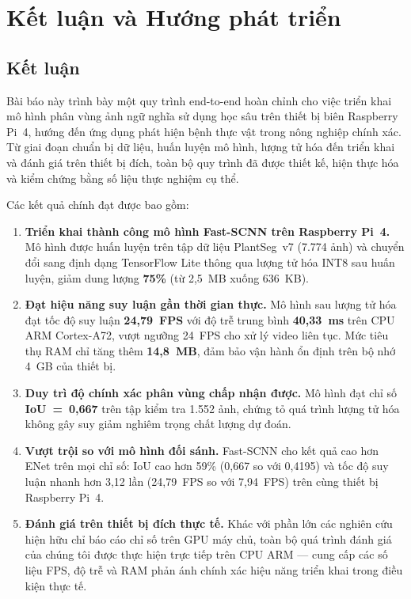 \documentclass[conference]{IEEEtran}
\begin{document}
\section{Kết luận và Hướng phát triển}

\subsection{Kết luận}

Bài báo này trình bày một quy trình end-to-end hoàn chỉnh cho việc triển khai mô hình phân vùng ảnh ngữ nghĩa sử dụng học sâu trên thiết bị biên Raspberry Pi~4, hướng đến ứng dụng phát hiện bệnh thực vật trong nông nghiệp chính xác. Từ giai đoạn chuẩn bị dữ liệu, huấn luyện mô hình, lượng tử hóa đến triển khai và đánh giá trên thiết bị đích, toàn bộ quy trình đã được thiết kế, hiện thực hóa và kiểm chứng bằng số liệu thực nghiệm cụ thể.

Các kết quả chính đạt được bao gồm:
\begin{enumerate}
  \item \textbf{Triển khai thành công mô hình Fast-SCNN trên Raspberry Pi~4.} Mô hình được huấn luyện trên tập dữ liệu PlantSeg~v7 (7.774 ảnh) và chuyển đổi sang định dạng TensorFlow Lite thông qua lượng tử hóa INT8 sau huấn luyện, giảm dung lượng \textbf{75\%} (từ 2,5~MB xuống 636~KB).
  \item \textbf{Đạt hiệu năng suy luận gần thời gian thực.} Mô hình sau lượng tử hóa đạt tốc độ suy luận \textbf{24,79~FPS} với độ trễ trung bình \textbf{40,33~ms} trên CPU ARM Cortex-A72, vượt ngưỡng 24~FPS cho xử lý video liên tục. Mức tiêu thụ RAM chỉ tăng thêm \textbf{14,8~MB}, đảm bảo vận hành ổn định trên bộ nhớ 4~GB của thiết bị.
  \item \textbf{Duy trì độ chính xác phân vùng chấp nhận được.} Mô hình đạt chỉ số \textbf{IoU~=~0,667} trên tập kiểm tra 1.552 ảnh, chứng tỏ quá trình lượng tử hóa không gây suy giảm nghiêm trọng chất lượng dự đoán.
  \item \textbf{Vượt trội so với mô hình đối sánh.} Fast-SCNN cho kết quả cao hơn ENet trên mọi chỉ số: IoU cao hơn 59\% (0,667 so với 0,4195) và tốc độ suy luận nhanh hơn 3,12 lần (24,79~FPS so với 7,94~FPS) trên cùng thiết bị Raspberry Pi~4.
  \item \textbf{Đánh giá trên thiết bị đích thực tế.} Khác với phần lớn các nghiên cứu hiện hữu chỉ báo cáo chỉ số trên GPU máy chủ, toàn bộ quá trình đánh giá của chúng tôi được thực hiện trực tiếp trên CPU ARM --- cung cấp các số liệu FPS, độ trễ và RAM phản ánh chính xác hiệu năng triển khai trong điều kiện thực tế.
\end{enumerate}
\end{document}
